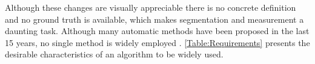 Although these changes are visually appreciable there is no concrete definition and no ground truth is available, which makes segmentation and measurement a daunting task. Although many automatic methods have been proposed in the last 15 years, no single method is widely employed \cite{23084503}. \ref{Table:Requirements} presents the desirable characteristics of an algorithm to be widely used.
    
    
    